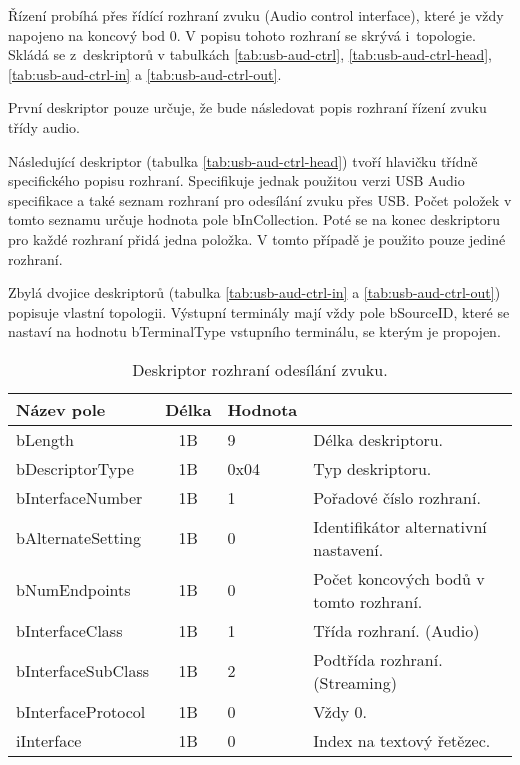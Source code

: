 Řízení probíhá přes řídící rozhraní zvuku (Audio control interface), které je vždy napojeno na koncový bod 0.  V popisu tohoto rozhraní se skrývá i~topologie. Skládá se z~deskriptorů v tabulkách \ref{tab:usb-aud-ctrl}, \ref{tab:usb-aud-ctrl-head}, \ref{tab:usb-aud-ctrl-in} a \ref{tab:usb-aud-ctrl-out}.

První deskriptor pouze určuje, že bude následovat popis rozhraní řízení zvuku třídy audio.

Následující deskriptor  (tabulka \ref{tab:usb-aud-ctrl-head}) tvoří hlavičku třídně specifického popisu rozhraní. Specifikuje jednak použitou verzi USB Audio specifikace a také seznam rozhraní pro odesílání zvuku přes USB. Počet položek v tomto seznamu určuje hodnota pole bInCollection. Poté se na konec deskriptoru pro každé rozhraní přidá jedna položka. V tomto případě je použito pouze jediné rozhraní.

Zbylá dvojice deskriptorů (tabulka \ref{tab:usb-aud-ctrl-in} a \ref{tab:usb-aud-ctrl-out}) popisuje vlastní topologii. Výstupní terminály mají vždy pole bSourceID, které se nastaví na hodnotu bTerminalType vstupního terminálu, se kterým je propojen.


\begin{table}[ht!]
\begin{center}
\begin{tabular}{|l|c|l|l|}
\hline 
Název pole & Délka & Hodnota &  \\ 
\hline
bLength & 1B & 9 & Délka deskriptoru.\\
\hline
bDescriptorType & 1B & 0x04 & Typ deskriptoru. \\
\hline
bInterfaceNumber & 1B & 1 & Pořadové číslo rozhraní.\\
\hline
bAlternateSetting & 1B & 0 & Identifikátor alternativní nastavení.\\
\hline
bNumEndpoints & 1B & 0 & Počet koncových bodů v tomto rozhraní.\\
\hline
bInterfaceClass & 1B & 1 & Třída rozhraní. (Audio)\\
\hline
bInterfaceSubClass & 1B & 2 & Podtřída rozhraní. (Streaming)\\
\hline
bInterfaceProtocol & 1B & 0 & Vždy 0. \\
\hline
iInterface & 1B & 0 & Index na textový řetězec.\\
\hline
\end{tabular} 
\end{center}
\caption{Deskriptor rozhraní odesílání zvuku.}
\label{tab:usb-aud-snd-0} 
\end{table}


